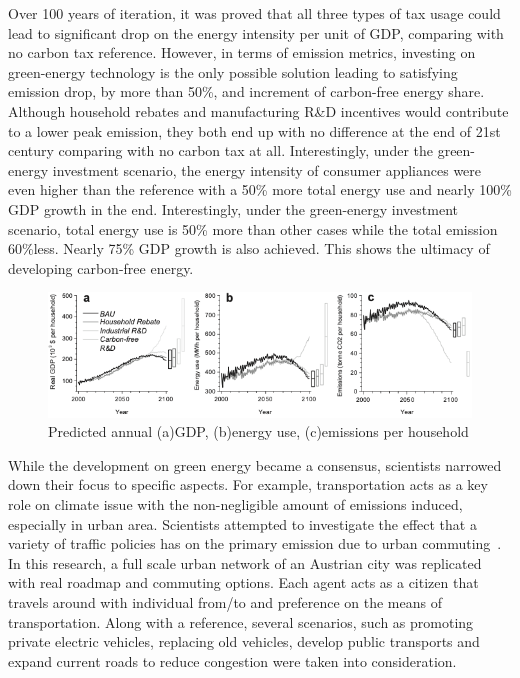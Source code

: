 \documentclass[12pt,twoside]{report}
\begin{document}
	Over 100 years of iteration, it was proved that all three types of tax usage could lead to significant drop on
	the energy intensity per unit of GDP, comparing with no carbon tax reference.
	However, in terms of emission metrics, investing on green-energy technology is the only possible solution leading
	to satisfying emission drop, by more than 50\%, and increment of carbon-free energy share.
	Although household rebates and manufacturing R\&D incentives would contribute to a lower peak emission, they both
	end up with no difference at the end of 21st century comparing with no carbon tax at all.
	Interestingly, under the green-energy investment scenario, the energy intensity of consumer appliances were even
	higher than the reference with a 50\% more total energy use and nearly 100\% GDP growth in the end.
	Interestingly, under the green-energy investment scenario, total energy use is 50\% more than other cases
	while the total emission 60\%less.
	Nearly 75\% GDP growth is also achieved.
	This shows the ultimacy of developing carbon-free energy.
	\begin{figure}[htb]
		\centering
		\includegraphics[width = 1\linewidth]{./figures/ENGAGE_Result}
		\caption{Predicted annual (a)GDP, (b)energy use, (c)emissions per household\cite{GERST201362}}
		\label{fig:ENGAGE_Result}
	\end{figure}
	
	While the development on green energy became a consensus, scientists narrowed down their focus to specific
	aspects.
	For example, transportation acts as a key role on climate issue with the non-negligible amount of emissions
	induced, especially in urban area.
	Scientists attempted to investigate the effect that a variety of traffic policies has on the primary emission
	due to urban commuting~\cite{hofer2018large}.
	In this research, a full scale urban network of an Austrian city was replicated with real roadmap and commuting
	options.
	Each agent acts as a citizen that travels around with individual from/to and preference on the means of
	transportation.
	Along with a reference, several scenarios, such as promoting private electric vehicles, replacing old vehicles,
	develop public transports and expand current roads to reduce congestion were taken into consideration.\\
	
\end{document}
